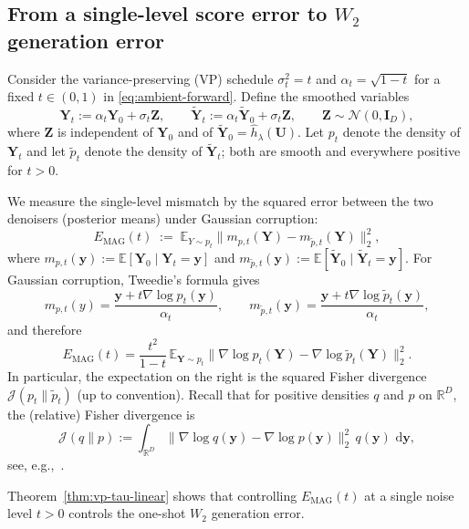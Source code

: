 \documentclass[12pt]{article}
\theoremstyle{definition} %
\newcommand{\R}{\mathbb{R}}
\newcommand{\dd}{\,\mathrm{d}}
\newcommand{\U}{\bm U}
\newcommand{\Y}{\bm Y}
\newcommand{\Z}{\bm Z}
\newcommand{\y}{\bm y}
\providecommand{\E}{\mathbb{E}}
\begin{document}
\subsection{From a single-level score error to \texorpdfstring{$W_2$}{W2} generation error}

Consider the variance-preserving (VP) schedule $\sigma_t^2=t$ and $\alpha_t=\sqrt{1-t}$ for a fixed $t\in(0,1)$ in \eqref{eq:ambient-forward}.
Define the smoothed variables
\[
\Y_t := \alpha_t \Y_0 + \sigma_t \Z,\qquad
\tilde{\Y}_t := \alpha_t \tilde{\Y}_0 + \sigma_t \Z,
\qquad \Z\sim\mathcal{N}(0,\bm{I}_D),
\]
where $\Z$ is independent of $\Y_0$ and of $\tilde{\Y}_0=\hat h_{\lambda}(\U)$.
Let $p_t$ denote the density of $\Y_t$ and let $\tilde p_t$ denote the density of $\tilde{\Y}_t$; both are smooth and everywhere positive for $t>0$.

We measure the single-level mismatch by the squared error between the two denoisers (posterior means) under Gaussian corruption:
\begin{equation}
\label{eq:Emag-def}
E_{\mathrm{MAG}}(t)
\;:=\;
\E_{Y\sim p_t}\bigl\|m_{p,t}(\Y)-m_{\tilde p,t}(\Y)\bigr\|_2^2,
\end{equation}
where $m_{p,t}(\y):=\E[\Y_0\mid \Y_t=\y]$ and
$m_{\tilde p,t}(\y):=\E[\tilde{\Y}_0\mid \tilde{\Y}_t=\y]$.
For Gaussian corruption, Tweedie's formula gives
\[
m_{p,t}(y)=\frac{\y+t\nabla\log p_t(\y)}{\alpha_t},
\qquad
m_{\tilde p,t}(\y)=\frac{\y+t\nabla\log \tilde p_t(\y)}{\alpha_t},
\]
and therefore
\[
E_{\mathrm{MAG}}(t)
=
\frac{t^2}{1-t}\,
\E_{\Y\sim p_t}\bigl\|\nabla\log p_t(\Y)-\nabla\log \tilde p_t(\Y)\bigr\|_2^2.
\]
In particular, the expectation on the right is the squared Fisher divergence $\mathcal{J}(p_t\|\tilde p_t)$ (up to convention). Recall that for positive densities $q$ and $p$ on $\R^D$, the (relative) Fisher divergence is
\[
\mathcal{J}(q\|p)
:=
\int_{\R^D}\bigl\|\nabla\log q(\y)-\nabla\log p(\y)\bigr\|_2^2\,q(\y)\,\dd \y,
\]
see, e.g.,~\cite{shen1997sieves}.

Theorem~\ref{thm:vp-tau-linear} shows that controlling $E_{\mathrm{MAG}}(t)$ at a single noise level $t>0$
controls the one-shot $W_2$ generation error.
\end{document}
